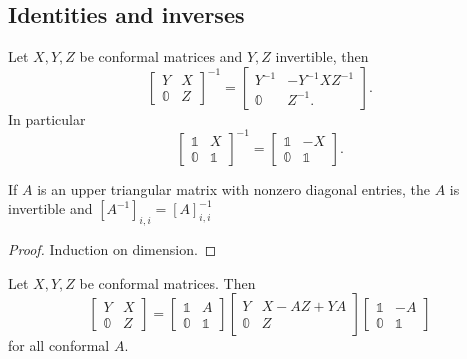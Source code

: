 \subsection{Identities and inverses}
\begin{lemma}
Let $X,Y,Z$ be conformal matrices and $Y,Z$ invertible, then
\[ \begin{bmatrix}
Y & X \\ \mathbb{0} & Z
\end{bmatrix}^{-1} = \begin{bmatrix}
Y^{-1} & -Y^{-1}XZ^{-1} \\ \mathbb{0} & Z^{-1}.
\end{bmatrix}. \]
In particular
\[ \begin{bmatrix}
\mathbb{1} & X \\ \mathbb{0} & \mathbb{1}
\end{bmatrix}^{-1} = \begin{bmatrix}
\mathbb{1} & -X \\ \mathbb{0} & \mathbb{1}
\end{bmatrix}. \]
\end{lemma}
\begin{corollary}
If $A$ is an upper triangular matrix with nonzero diagonal entries, the $A$ is invertible and $[A^{-1}]_{i,i} = [A]_{i,i}^{-1}$
\end{corollary}
\begin{proof}
Induction on dimension.
\end{proof}

\begin{lemma}
Let $X,Y,Z$ be conformal matrices. Then
\[ \begin{bmatrix}
Y & X \\ \mathbb{0} & Z
\end{bmatrix} = \begin{bmatrix}
\mathbb{1} & A \\ \mathbb{0} & \mathbb{1}
\end{bmatrix}\begin{bmatrix}
Y & X-AZ + YA \\ \mathbb{0} & Z
\end{bmatrix}\begin{bmatrix}
\mathbb{1} & -A \\ \mathbb{0} & \mathbb{1}
\end{bmatrix} \]
for all conformal $A$.
\end{lemma}

